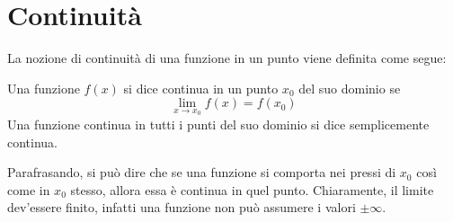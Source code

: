 \section{Continuità}
La nozione di continuità di una funzione in un punto viene definita come segue:
\begin{defin}
	\label{defin:continua}
	Una funzione $f(x)$ si dice continua in un punto $x_0$ del suo dominio se
	\[
		\lim_{x\to x_0} f(x) = f(x_0)
	\]
	Una funzione continua in tutti i punti del suo dominio si dice semplicemente continua.
\end{defin}
Parafrasando, si può dire che se una funzione si comporta nei pressi di $x_0$ così come in $x_0$ stesso, allora essa è continua in quel punto. Chiaramente, il limite dev'essere finito, infatti una funzione non può assumere i valori $\pm\infty$.


